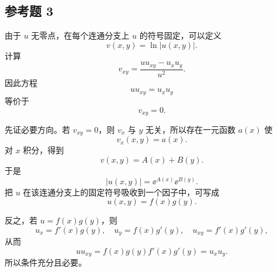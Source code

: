 \subsection*{参考题 3}
\begin{xsolution}
由于 $u$ 无零点，在每个连通分支上 $u$ 的符号固定，可以定义
\[
  v(x,y)=\ln|u(x,y)|.
\]
计算
\[
  v_{xy}
  =\frac{u u_{xy}-u_xu_y}{u^2}.
\]
因此方程
\[
  uu_{xy}=u_xu_y
\]
等价于
\[
  v_{xy}=0.
\]

先证必要方向。若 $v_{xy}=0$，则 $v_x$ 与 $y$ 无关，所以存在一元函数 $a(x)$ 使
\[
  v_x(x,y)=a(x).
\]
对 $x$ 积分，得到
\[
  v(x,y)=A(x)+B(y).
\]
于是
\[
  |u(x,y)|=\ee^{A(x)}\ee^{B(y)}.
\]
把 $u$ 在该连通分支上的固定符号吸收到一个因子中，可写成
\[
  \boxed{u(x,y)=f(x)g(y)}.
\]

反之，若 $u=f(x)g(y)$，则
\[
  u_x=f'(x)g(y),
  \quad
  u_y=f(x)g'(y),
  \quad
  u_{xy}=f'(x)g'(y),
\]
从而
\[
  uu_{xy}
  =f(x)g(y)f'(x)g'(y)
  =u_xu_y.
\]
所以条件充分且必要。
\end{xsolution}

